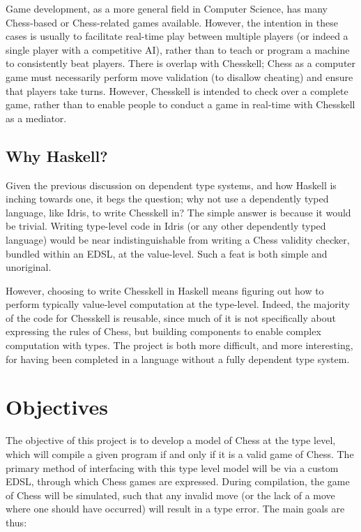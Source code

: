 Game development, as a more general field in Computer Science, has many Chess-based or Chess-related games available. However, the intention in these cases is usually to facilitate real-time play between multiple players (or indeed a single player with a competitive AI), rather than to teach or program a machine to consistently beat players. There is overlap with Chesskell; Chess as a computer game must necessarily perform move validation (to disallow cheating) and ensure that players take turns. However, Chesskell is intended to check over a complete game, rather than to enable people to conduct a game in real-time with Chesskell as a mediator.

\subsection{Why Haskell?}

Given the previous discussion on dependent type systems, and how Haskell is inching towards one, it begs the question; why not use a dependently typed language, like Idris, to write Chesskell in? The simple answer is because it would be trivial. Writing type-level code in Idris (or any other dependently typed language) would be near indistinguishable from writing a Chess validity checker, bundled within an EDSL, at the value-level. Such a feat is both simple and unoriginal.

However, choosing to write Chesskell in Haskell means figuring out how to perform typically value-level computation at the type-level. Indeed, the majority of the code for Chesskell is reusable, since much of it is not specifically about expressing the rules of Chess, but building components to enable complex computation with types. The project is both more difficult, and more interesting, for having been completed in a language without a fully dependent type system.

\section{Objectives}

The objective of this project is to develop a model of Chess at the type level, which will compile a given program if and only if it is a valid game of Chess. The primary method of interfacing with this type level model will be via a custom EDSL, through which Chess games are expressed. During compilation, the game of Chess will be simulated, such that any invalid move (or the lack of a move where one should have occurred) will result in a type error. The main goals are thus:

